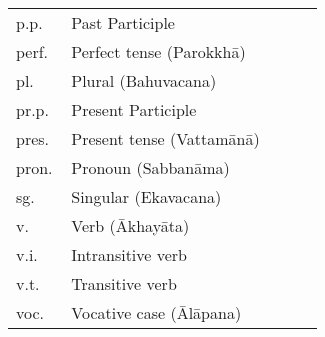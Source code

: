 \begin{longtable}[c]{@{}>{\raggedright\arraybackslash}p{0.17\linewidth}>{\raggedright\arraybackslash}p{0.78\linewidth}@{}}
p.p. & Past Participle \\
perf. & Perfect tense (Parokkh\=a) \\
pl. & Plural (Bahuvacana) \\
pr.p. & Present Participle \\
pres. & Present tense (Vattam\=an\=a) \\
pron. & Pronoun (Sabban\=ama) \\
sg. & Singular (Ekavacana) \\
v. & Verb (\=Akhay\=ata) \\
v.i. & Intransitive verb \\
v.t. & Transitive verb \\
voc. & Vocative case (\=Al\=apana) \\
\end{longtable}
